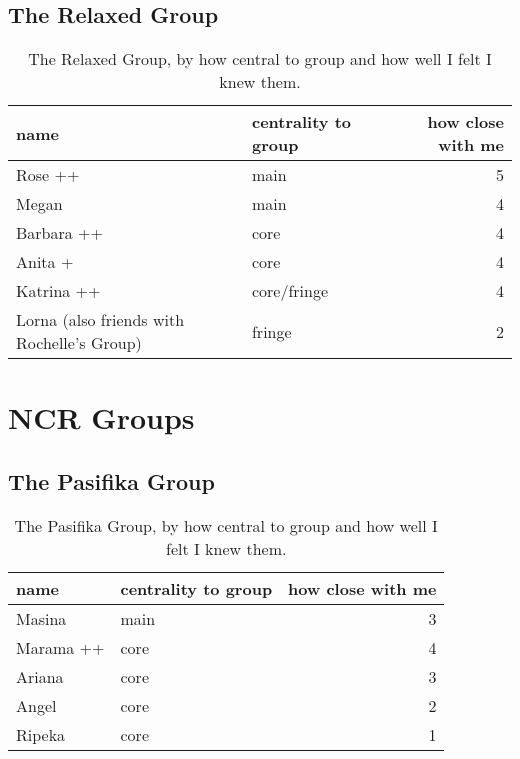 \subsection{The Relaxed Group}
\nopagebreak
\begin{table}[ht]
\caption{The Relaxed Group, by how central to group and how well I felt I knew them.}	\label{append:Relaxed}
	\centering
		\begin{tabular}{llr} \\
		\hline
							name & centrality to group & how close with me  \\
			\hline
Rose ++ & main & 5 \\
Megan & main & 4 \\
Barbara ++ & core & 4 \\
Anita + & core & 4 \\
Katrina ++ & core/fringe & 4 \\
Lorna (also friends with Rochelle's Group) & fringe & 2 \\
   \hline
		\end{tabular}
\end{table}
\mbox{}

\pagebreak




\bigskip

\pagebreak
\section{NCR Groups}
\nopagebreak
\subsection{The Pasifika Group}
\nopagebreak
\begin{table}[ht]
\caption{The Pasifika Group, by how central to group and how well I felt I knew them.}\label{append:Pasifika}
	\centering
		\begin{tabular}{llr} \\
		\hline
					name & centrality to group & how close with me  \\
			\hline
Masina & main & 3 \\
Marama ++ & core & 4 \\
Ariana & core & 3 \\
Angel  & core & 2 \\
Ripeka & core & 1 \\
   \hline
				\end{tabular}
\end{table}


